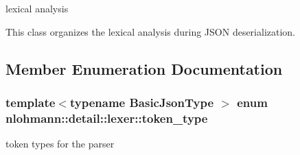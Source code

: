 lexical analysis 

This class organizes the lexical analysis during J\+S\+ON deserialization. 

\subsection{Member Enumeration Documentation}
\subsubsection[{\texorpdfstring{token\+\_\+type}{token_type}}]{\setlength{\rightskip}{0pt plus 5cm}template$<$typename Basic\+Json\+Type $>$ enum {\bf nlohmann\+::detail\+::lexer\+::token\+\_\+type}\hspace{0.3cm}{\ttfamily [strong]}}\hypertarget{classnlohmann_1_1detail_1_1lexer_a3f313cdbe187cababfc5e06f0b69b098}{}\label{classnlohmann_1_1detail_1_1lexer_a3f313cdbe187cababfc5e06f0b69b098}


token types for the parser 

